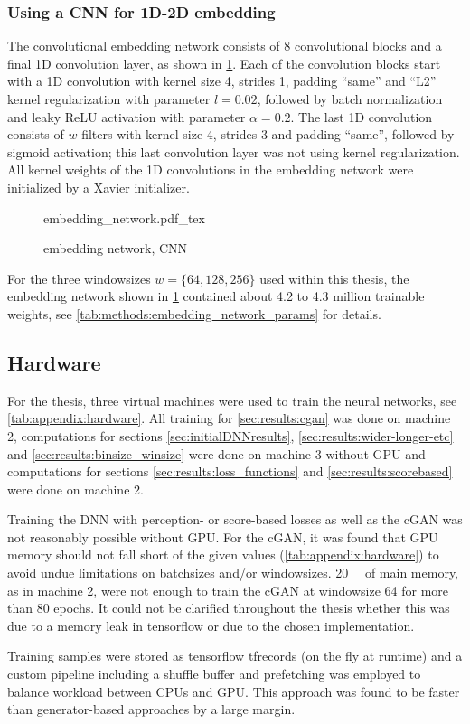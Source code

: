 \subsubsection{Using a CNN for 1D-2D embedding} \label{sec:methods:cnn-embedding}
The convolutional embedding network consists of 8 convolutional blocks and a final 1D convolution layer, 
as shown in \cref{fig:methods:GAN_arch:embedding_network}.
Each of the convolution blocks start with a 1D convolution with kernel size 4, strides 1, padding ``same'' 
and ``L2'' kernel regularization with parameter $l=0.02$, followed by batch normalization and leaky ReLU activation
with parameter $\alpha=0.2$. 
The last 1D convolution consists of $w$ filters with kernel size 4, strides 3 and padding ``same'',
followed by sigmoid activation; this last convolution layer was not using kernel regularization.
All kernel weights of the 1D convolutions in the embedding network were initialized by a Xavier initializer.
\begin{figure}[p]
    \scriptsize
    \centering
    {embedding_network.pdf_tex}
    \caption{embedding network, CNN} \label{fig:methods:GAN_arch:embedding_network}
\end{figure}

For the three windowsizes $w=\{64,128,256\}$ used within this thesis, the embedding network shown in \cref{fig:methods:GAN_arch:embedding_network} 
contained about 4.2 to 4.3 million trainable weights, see \cref{tab:methods:embedding_network_params} for details.

\subsection{Hardware} \label{sec:methods:hardware}
For the thesis, three virtual machines were used to train the neural networks, see \cref{tab:appendix:hardware}.
All training for \cref{sec:results:cgan} was done on machine 2, 
computations for sections \ref{sec:initialDNNresults}, \ref{sec:results:wider-longer-etc} and \ref{sec:results:binsize_winsize}
were done on machine 3 without GPU and computations for sections \ref{sec:results:loss_functions} and \ref{sec:results:scorebased} were done on machine 2.

Training the DNN with perception- or score-based losses as well as the cGAN was not reasonably possible without GPU.
For the cGAN, it was found that GPU memory should not fall short of the given values (\cref{tab:appendix:hardware})
to avoid undue limitations on batchsizes and/or windowsizes.
\SI{20}{\giga\byte} of main memory, as in machine 2, were not enough to train the cGAN at windowsize 64 for more than 80 epochs.
It could not be clarified throughout the thesis whether this was due to a memory leak in tensorflow or due to the chosen implementation.

Training samples were stored as tensorflow tfrecords (on the fly at runtime) and a custom pipeline including a shuffle buffer and prefetching 
was employed to balance workload between CPUs and GPU.
This approach was found to be faster than generator-based approaches by a large margin.
